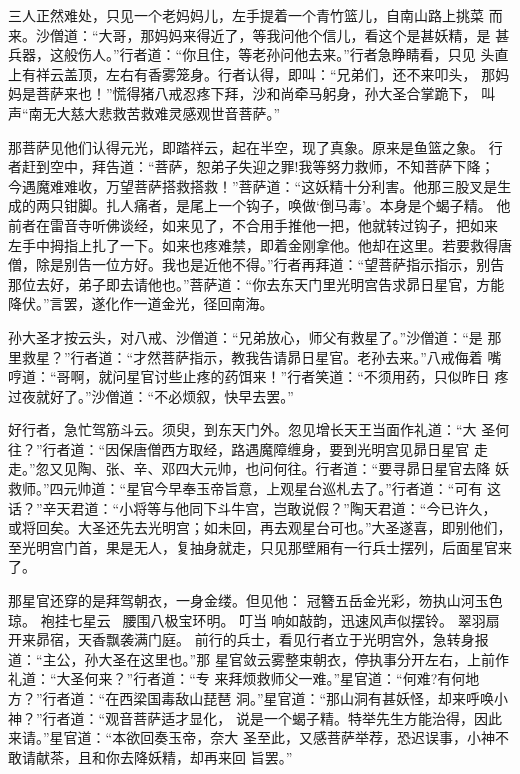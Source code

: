 三人正然难处，只见一个老妈妈儿，左手提着一个青竹篮儿，自南山路上挑菜
而来。沙僧道：“大哥，那妈妈来得近了，等我问他个信儿，看这个是甚妖精，是
甚兵器，这般伤人。”行者道：“你且住，等老孙问他去来。”行者急睁睛看，只见
头直上有祥云盖顶，左右有香雾笼身。行者认得，即叫：“兄弟们，还不来叩头，
那妈妈是菩萨来也！”慌得猪八戒忍疼下拜，沙和尚牵马躬身，孙大圣合掌跪下，
叫声“南无大慈大悲救苦救难灵感观世音菩萨。”

那菩萨见他们认得元光，即踏祥云，起在半空，现了真象。原来是鱼篮之象。
行者赶到空中，拜告道：“菩萨，恕弟子失迎之罪!我等努力救师，不知菩萨下降；
今遇魔难难收，万望菩萨搭救搭救！”菩萨道：“这妖精十分利害。他那三股叉是生
成的两只钳脚。扎人痛者，是尾上一个钩子，唤做‘倒马毒’。本身是个蝎子精。
他前者在雷音寺听佛谈经，如来见了，不合用手推他一把，他就转过钩子，把如来
左手中拇指上扎了一下。如来也疼难禁，即着金刚拿他。他却在这里。若要救得唐
僧，除是别告一位方好。我也是近他不得。”行者再拜道：“望菩萨指示指示，别告
那位去好，弟子即去请他也。”菩萨道：“你去东天门里光明宫告求昴日星官，方能
降伏。”言罢，遂化作一道金光，径回南海。

孙大圣才按云头，对八戒、沙僧道：“兄弟放心，师父有救星了。”沙僧道：“是
那里救星？”行者道：“才然菩萨指示，教我告请昴日星官。老孙去来。”八戒侮着
嘴哼道：“哥啊，就问星官讨些止疼的药饵来！”行者笑道：“不须用药，只似昨日
疼过夜就好了。”沙僧道：“不必烦叙，快早去罢。”

好行者，急忙驾筋斗云。须臾，到东天门外。忽见增长天王当面作礼道：“大
圣何往？”行者道：“因保唐僧西方取经，路遇魔障缠身，要到光明宫见昴日星官
走走。”忽又见陶、张、辛、邓四大元帅，也问何往。行者道：“要寻昴日星官去降
妖救师。”四元帅道：“星官今早奉玉帝旨意，上观星台巡札去了。”行者道：“可有
这话？”辛天君道：“小将等与他同下斗牛宫，岂敢说假？”陶天君道：“今已许久，
或将回矣。大圣还先去光明宫；如未回，再去观星台可也。”大圣遂喜，即别他们，
至光明宫门首，果是无人，复抽身就走，只见那壁厢有一行兵士摆列，后面星官来
了。

那星官还穿的是拜驾朝衣，一身金缕。但见他：
冠簪五岳金光彩，笏执山河玉色琼。
袍挂七星云，腰围八极宝环明。
叮当响如敲韵，迅速风声似摆铃。
翠羽扇开来昴宿，天香飘袭满门庭。
前行的兵士，看见行者立于光明宫外，急转身报道：“主公，孙大圣在这里也。”那
星官敛云雾整束朝衣，停执事分开左右，上前作礼道：“大圣何来？”行者道：“专
来拜烦救师父一难。”星官道：“何难?有何地方？”行者道：“在西梁国毒敌山琵琶
洞。”星官道：“那山洞有甚妖怪，却来呼唤小神？”行者道：“观音菩萨适才显化，
说是一个蝎子精。特举先生方能治得，因此来请。”星官道：“本欲回奏玉帝，奈大
圣至此，又感菩萨举荐，恐迟误事，小神不敢请献茶，且和你去降妖精，却再来回
旨罢。”

